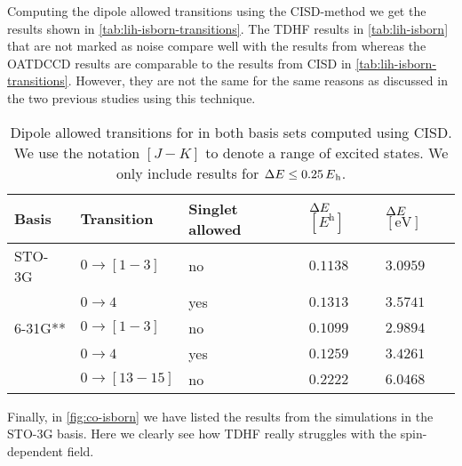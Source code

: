         Computing the dipole allowed transitions using the CISD-method we get
        the results shown in \autoref{tab:lih-isborn-transitions}.
        The TDHF results in \autoref{tab:lih-isborn} that are not marked as
        noise compare well with the results from \citeauthor{isborn}
        \cite{isborn} whereas the OATDCCD results are comparable to the results
        from CISD in \autoref{tab:lih-isborn-transitions}.
        However, they are not the same for the same reasons as discussed in the
        two previous studies using this technique.
        \begin{table}
            \centering
            \caption{Dipole allowed transitions for  in both basis sets
            computed using CISD.
            We use the notation $[J - K]$ to denote a range of excited states.
            We only include results for $\Delta \energy \leq
            \SI{0.25}{\hartree}$.}
            \begin{tabular}{@{}lllll@{}}
                \toprule
                Basis & Transition & Singlet allowed
                & $\Delta E$ $[\si{\hartree}]$
                & $\Delta E$ $[\si{\electronvolt}]$ \\
                \midrule
                STO-3G & $0 \to [1-3]$ & no & $0.1138$ & $3.0959$ \\
                & $0 \to 4$ & yes & $0.1313$ & $3.5741$ \\
                6-31G** & $0 \to [1-3]$ & no & $0.1099$ & $2.9894$ \\
                & $0 \to 4$ & yes & $0.1259$ & $3.4261$ \\
                & $0 \to [13-15]$ & no & $0.2222$ & $6.0468$ \\
                \bottomrule
            \end{tabular}
            \label{tab:lih-isborn-transitions}
        \end{table}
        Finally, in \autoref{fig:co-isborn} we have listed the results from the
         simulations in the STO-3G basis.
        Here we clearly see how TDHF really struggles with the spin-dependent
        field.
